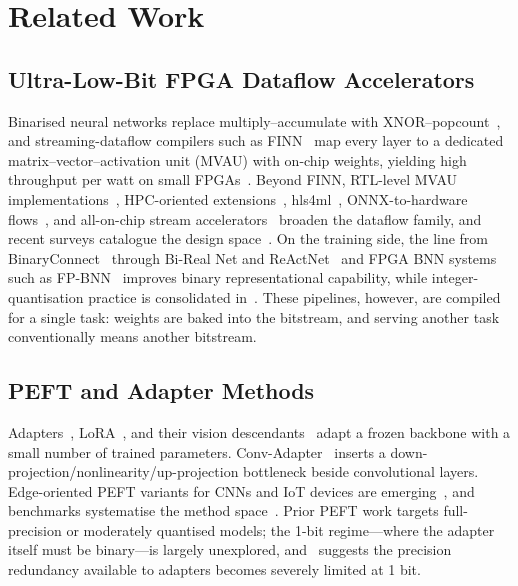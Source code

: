 \documentclass[journal]{IEEEtran}
\begin{document}
\section{Related Work}
\subsection{Ultra-Low-Bit FPGA Dataflow Accelerators}
Binarised neural networks replace multiply--accumulate with XNOR--popcount~\cite{Rastegari2016XNOR,Hubara2016BinarizedNN}, and streaming-dataflow compilers such as FINN~\cite{Umuroglu2017FINN,Blott2018FINNR} map every layer to a dedicated matrix--vector--activation unit (MVAU) with on-chip weights, yielding high throughput per watt on small FPGAs~\cite{Gao2025CNNFPGA,Nechi2023FPGADLSurvey}.  Beyond FINN, RTL-level MVAU implementations~\cite{Alam2023RTLMVU}, HPC-oriented extensions~\cite{Jungemann2025FINNHPC}, hls4ml~\cite{Schulte2025hls4ml}, ONNX-to-hardware flows~\cite{Manca2024ONNXtoHW}, and all-on-chip stream accelerators~\cite{Kang2023AoCStream,Zhao2024HighThroughput} broaden the dataflow family, and recent surveys catalogue the design space~\cite{Jiang2025FPGACNNReview,Li2025DataflowTiling,Su2023BNNFPGASurvey,Zhan2023BNNEdge,Antunes2025SpaceSurvey,Liu2024LightweightDLSurvey,Khaki2025OptimizingDL}. On the training side, the line from BinaryConnect~\cite{Courbariaux2016BinaryConnect} through Bi-Real Net and ReActNet~\cite{Liu2018BiReal,Liu2020ReActNet} and FPGA BNN systems such as FP-BNN~\cite{Liang2018FPBNN} improves binary representational capability, while integer-quantisation practice is consolidated in~\cite{Jacob2018Quantization,Nagel2021QuantWhitepaper,Fouda2025QuantCNNHW,Tasci2025FPGAQNN}. These pipelines, however, are compiled for a single task: weights are baked into the bitstream, and serving another task conventionally means another bitstream.

\subsection{PEFT and Adapter Methods}
Adapters~\cite{Houlsby2019Adapters}, LoRA~\cite{Hu2022LoRA}, and their vision descendants~\cite{Yu2024VisualTuning} adapt a frozen backbone with a small number of trained parameters. Conv-Adapter~\cite{Chen2024ConvAdapter} inserts a down-projection/nonlinearity/up-projection bottleneck beside convolutional layers. Edge-oriented PEFT variants for CNNs and IoT devices are emerging~\cite{Ding2024LoRAC,Kwak2025LoRAEdge,Lu2025CacheAdapter}, and benchmarks systematise the method space~\cite{Belanec2025PEFTBench}. Prior PEFT work targets full-precision or moderately quantised models; the 1-bit regime---where the adapter itself must be binary---is largely unexplored, and~\cite{Jie2023PrecisionRedundancy} suggests the precision redundancy available to adapters becomes severely limited at 1 bit.
\end{document}
